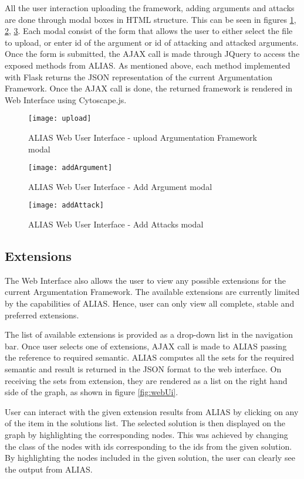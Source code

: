 All the user interaction uploading the framework, adding arguments and attacks are done through modal boxes in HTML structure. This can be seen in figures \ref{fig:upload}, \ref{fig:addArgument}, \ref{fig:addAttacks}. Each modal consist of the form that allows the user to either select the file to upload, or enter id of the argument or id of attacking and attacked arguments. Once the form is submitted, the AJAX call is made through JQuery to access the exposed methods from ALIAS. As mentioned above, each method implemented with Flask returns the JSON representation of the current Argumentation Framework. Once the AJAX call is done, the returned framework is rendered in Web Interface using Cytoscape.js.

\begin{figure}[!ht]
	\centering
	\texttt{[image: upload]}
	\caption{ALIAS Web User Interface - upload Argumentation Framework modal}
	\label{fig:upload}
\end{figure}

\begin{figure}[h]
	\centering
	\texttt{[image: addArgument]}
	\caption{ALIAS Web User Interface - Add Argument modal}
	\label{fig:addArgument}
\end{figure}

\begin{figure}[h]
	\centering
	\texttt{[image: addAttack]}
	\caption{ALIAS Web User Interface - Add Attacks modal}
	\label{fig:addAttacks}
\end{figure}

\subsection{Extensions}
The Web Interface also allows the user to view any possible extensions for the current Argumentation Framework. The available extensions are currently limited by the capabilities of ALIAS. Hence, user can only view all complete, stable and preferred extensions. 

The list of available extensions is provided as a drop-down list in the navigation bar. Once user selects one of extensions, AJAX call is made to ALIAS passing the reference to required semantic. ALIAS computes all the sets for the required semantic and result is returned in the JSON format to the web interface. On receiving the sets from extension, they are rendered as a list on the right hand side of the graph, as shown in figure \ref{fig:webUi}.

User can interact with the given extension results from ALIAS by clicking on any of the item in the solutions list. The selected solution is then displayed on the graph by highlighting the corresponding nodes. This was achieved by changing the class of the nodes with ids corresponding to the ids from the given solution. By highlighting the nodes included in the given solution, the user can clearly see the output from ALIAS.